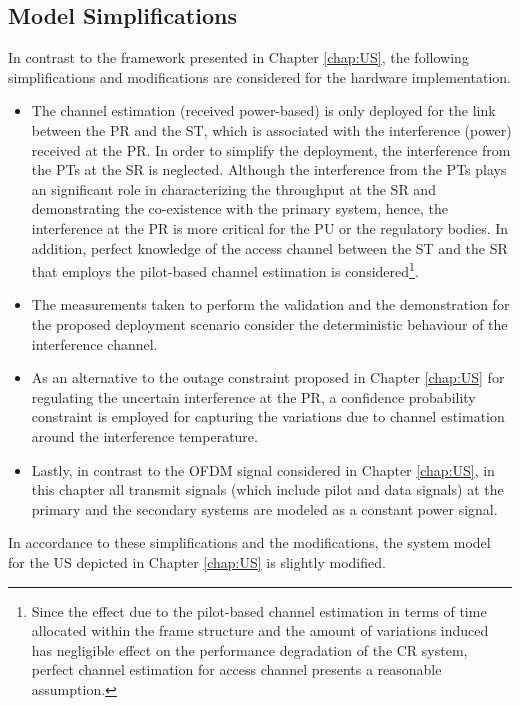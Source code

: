 \subsection{Model Simplifications}
\label{ssec:simp1}
In contrast to the framework presented in Chapter \ref{chap:US}, the following simplifications and modifications are considered for the hardware implementation.
\begin{itemize}
\item The channel estimation (received power-based) is only deployed for the link between the PR and the ST, which is associated with the interference (power) received at the PR. In order to simplify the deployment, the interference from the PTs at the SR is neglected. Although the interference from the PTs plays an significant role in characterizing the throughput at the SR and demonstrating the co-existence with the primary system, hence, the interference at the PR is more critical for the PU or the regulatory bodies. In addition, perfect knowledge of the access channel between the ST and the SR that employs the pilot-based channel estimation is considered\footnote{Since the effect due to the pilot-based channel estimation in terms of time allocated within the frame structure and the amount of variations induced has negligible effect on the performance degradation of the CR system, perfect channel estimation for access channel presents a reasonable assumption.}.  
\item The measurements taken to perform the validation and the demonstration for the proposed deployment scenario consider the deterministic behaviour of the interference channel.  
\item As an alternative to the outage constraint proposed in Chapter \ref{chap:US} for regulating the uncertain interference at the PR, a confidence probability constraint is employed for capturing the variations due to channel estimation around the interference temperature. %
\item Lastly, in contrast to the OFDM signal considered in Chapter \ref{chap:US}, in this chapter all transmit signals (which include pilot and data signals) at the primary and the secondary systems are modeled as a constant power signal. 
\end{itemize}

In accordance to these simplifications and the modifications, the system model for the US depicted in Chapter \ref{chap:US} is slightly modified. 

